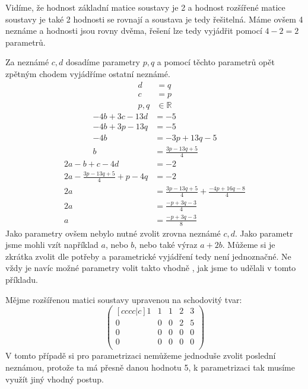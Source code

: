 \begin{example}
    Vidíme, že hodnost základní matice soustavy je 2 a hodnost rozšířené matice soustavy je také 2
    hodnosti se rovnají a soustava je tedy řešitelná. Máme ovšem 4 neznáme a hodnosti jsou rovny
    dvěma, řešení lze tedy vyjádřit pomocí $4-2=2$ parametrů.

    Za neznámé $c, d$ dosadíme parametry $p, q$ a pomocí těchto parametrů opět zpětným
    chodem vyjádříme ostatní neznámé.
    \begin{align*}
        d &= q\\
        c &= p\\
        p, q &\in \mathbb{R}
    \end{align*}
    \begin{align*}
        -4 b +3 c -13d &= -5\\
        -4b +3p -13q &= -5\\
        -4b &= -3p + 13q -5\\
        b &= \frac{3p - 13q + 5}{4}
    \end{align*}
    \begin{align*}
        2a -b +c -4d &= -2\\
        2a -\frac{3p - 13q + 5}{4} + p -4q &= -2\\
        2a &= \frac{3p - 13q + 5}{4} + \frac{-4p+16q-8}{4}\\
        2a &= \frac{-p +3q -3}{4}\\
        a &= \frac{-p +3q -3}{8}
    \end{align*}
    Jako parametry ovšem nebylo nutné zvolit zrovna neznámé $c, d$. Jako parametr jsme mohli vzít
    například $a$, nebo $b$, nebo také výraz $a + 2b$. Můžeme si je zkrátka zvolit dle potřeby a
    parametrické vyjádření tedy není jednoznačné. Ne vždy je navíc možné parametry volit takto
    vhodně , jak jsme to udělali v tomto příkladu.
\end{example}

\begin{example}
    Mějme rozšířenou matici soustavy upravenou na schodovitý tvar:
    \[
        \begin{pmatrix}[cccc|c]
            1 & 1 & 1 & 2 & 3\\
            0 & 0 & 0 & 2 & 5\\
            0 & 0 & 0 & 0 & 0\\
            0 & 0 & 0 & 0 & 0\\
        \end{pmatrix}
    \]
    V tomto případě si pro parametrizaci nemůžeme jednoduše zvolit poslední neznámou,
    protože ta má přesně danou hodnotu 5, k parametrizaci tak musíme využít jiný vhodný postup.
\end{example}

